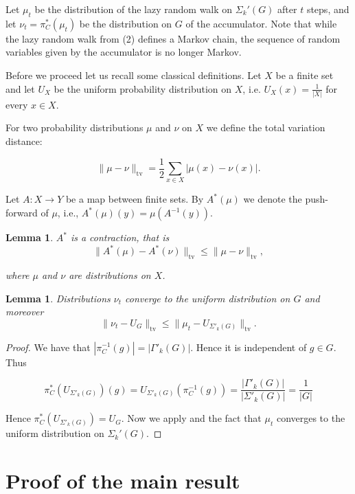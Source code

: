 \documentclass[12pt]{amsart}
\newtheorem{lemma}[theorem]{Lemma}
\theoremstyle{definition}
\numberwithin{figure}{section}
\numberwithin{table}{section}
\numberwithin{equation}{section}
\begin{document}
Let $\mu_t$ be the distribution of the lazy random walk on $\Sigma_k'(G)$ after $t$ steps, and let $\nu_t = \pi_C^*(\mu_t)$ be the distribution on $G$ of the accumulator. Note that while the lazy random walk from (2) defines a Markov chain, the sequence of random variables given by the accumulator is no longer Markov.  

Before we proceed let us recall some classical definitions. Let $X$ be a finite set and let $U_X$ be the uniform probability distribution on $X$, i.e. $U_X(x) = \frac{1}{|X|}$ for every $x \in X$. 

For two probability distributions $\mu$ and $\nu$ on $X$ we define the total variation distance:

$$
\|\mu-\nu\|_{\mathrm{tv}} = \frac{1}{2}\sum_{x\in X} |\mu(x)-\nu(x)|.
$$

Let $A \colon X \to Y$ be a map between finite sets.
By $A^*(\mu)$ we denote the push-forward of $\mu$, i.e., $A^*(\mu)(y) = \mu(A^{-1}(y))$.

\begin{lemma}\label{l:A-contracting}
$A^*$ is a contraction, that is
$$\|A^*(\mu)-A^*(\nu)\|_{\mathrm{tv}} \leq \|\mu-\nu\|_{\mathrm{tv}},$$

where $\mu$ and $\nu$ are distributions on $X$.
\end{lemma}

\begin{lemma}\label{l:acc-conv-to-uniform}
Distributions $\nu_t$ converge to the uniform distribution on $G$ and moreover
$$
\|\nu_t - U_G\|_{\mathrm{tv}} \leq \|\mu_t - U_{\Sigma'_k(G)}\|_{\mathrm{tv}}.
$$
\end{lemma}

\begin{proof}
We have that  $|\pi_C^{-1}(g)| = |\Gamma'_k(G)|$. Hence it is independent of $g \in G$. Thus

$$
\pi_C^*(U_{\Sigma'_k(G)})(g) = 
U_{\Sigma'_k(G)}(\pi_C^{-1}(g)) =
\frac{|\Gamma'_k(G)|}{|\Sigma'_k(G)|} = 
\frac{1}{|G|}
$$

Hence $\pi_C^*(U_{\Sigma'_k(G)}) = U_G$. Now we apply  and the fact that $\mu_t$ converges to the uniform distribution on $\Sigma_k'(G)$.
\end{proof}

\section{Proof of the main result}\label{s:main-result}
\end{document}
